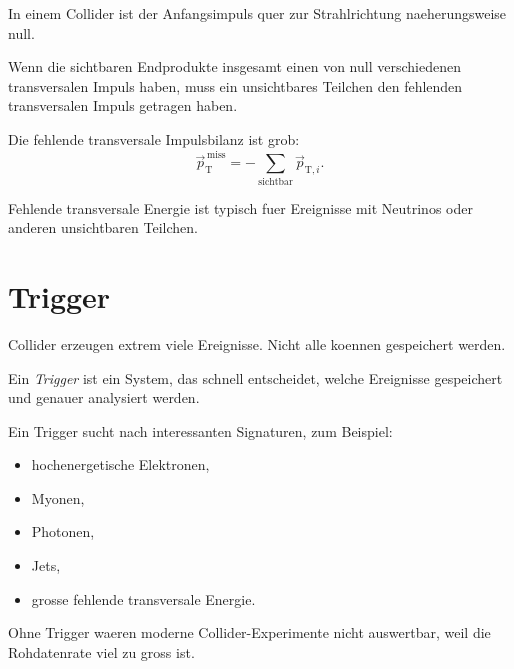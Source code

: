 \begin{conceptbox}
In einem Collider ist der Anfangsimpuls quer zur Strahlrichtung naeherungsweise null.

Wenn die sichtbaren Endprodukte insgesamt einen von null verschiedenen transversalen
Impuls haben, muss ein unsichtbares Teilchen den fehlenden transversalen Impuls
getragen haben.
\end{conceptbox}

\begin{formulabox}
Die fehlende transversale Impulsbilanz ist grob:
\[
    \vec p_{\mathrm{T}}^{\,\mathrm{miss}}
    =
    -
    \sum_{\mathrm{sichtbar}}
    \vec p_{\mathrm{T},i}.
\]
\end{formulabox}

\begin{examtipbox}
Fehlende transversale Energie ist typisch fuer Ereignisse mit Neutrinos oder anderen
unsichtbaren Teilchen.
\end{examtipbox}

\section{Trigger}

Collider erzeugen extrem viele Ereignisse.
Nicht alle koennen gespeichert werden.

\begin{definitionbox}
Ein \emph{Trigger} ist ein System, das schnell entscheidet, welche Ereignisse
gespeichert und genauer analysiert werden.
\end{definitionbox}

\begin{conceptbox}
Ein Trigger sucht nach interessanten Signaturen, zum Beispiel:
\begin{itemize}
    \item hochenergetische Elektronen,
    \item Myonen,
    \item Photonen,
    \item Jets,
    \item grosse fehlende transversale Energie.
\end{itemize}
\end{conceptbox}

\begin{notebox}
Ohne Trigger waeren moderne Collider-Experimente nicht auswertbar, weil die Rohdatenrate
viel zu gross ist.
\end{notebox}

